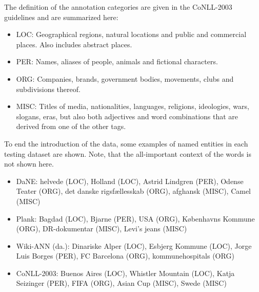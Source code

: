 \documentclass[main.tex]{subfiles}
\begin{document}
The definition of the annotation categories are given in the CoNLL-2003 guidelines \footnotemark and are summarized here:
\begin{itemize}
    \item LOC: Geographical regions, natural locations and public and commercial places. Also includes abstract places.
    \item PER: Names, aliases of people, animals and fictional characters.
    \item ORG: Companies, brands, government bodies, movements, clubs and subdivisions thereof.
    \item MISC: Titles of media, nationalities, languages, religions, ideologies, wars, slogans, eras, but also both adjectives and word combinations that are derived from one of the other tags.
\end{itemize}
To end the introduction of the data, some examples of named entities in each testing dataset are shown.
Note, that the all-important context of the words is not shown here.
\begin{itemize}
    \item DaNE: helvede (LOC), Holland (LOC), Astrid Lindgren (PER), Odense Teater (ORG), det danske rigsfællesskab (ORG), afghansk (MISC), Camel (MISC)
    \item Plank: Bagdad (LOC), Bjarne (PER), USA (ORG), Københavns Kommune (ORG), DR-dokumentar (MISC), Levi's jeans (MISC)
    \item Wiki-ANN (da.): Dinariske Alper (LOC), Esbjerg Kommune (LOC), Jorge Luis Borges (PER), FC Barcelona (ORG), kommunehospitals (ORG)
    \item CoNLL-2003: Buenos Aires (LOC), Whistler Mountain (LOC), Katja Seizinger (PER),  FIFA (ORG), Asian Cup (MISC), Swede (MISC)
\end{itemize}
\end{document}
